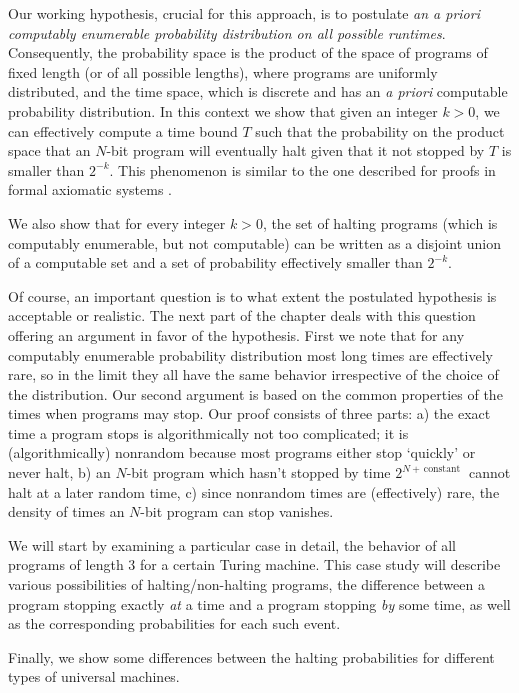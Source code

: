 \documentclass[12pt,twoside,openright]{report}
\begin{document}
Our working hypothesis, crucial for this approach, is to postulate {\it an a priori computably enumerable probability distribution on all possible runtimes}. Consequently, the probability space is the product of the space of programs of fixed length (or of all possible lengths), where programs are uniformly distributed, and the time space, which is discrete and has an {\it a priori} computable probability distribution. In this context we show that given an integer $k>0$, we can effectively compute a time bound $T$ such that  the probability on the product space that an $N$-bit program will eventually halt given that it not stopped by $T$ is smaller than
$2^{-k}$. This phenomenon is similar to the one described for proofs in formal axiomatic systems \cite{CJ}.

We also show that for every integer $k >0$, the set of halting programs (which is computably enumerable, but not computable) can be written as  a disjoint union of a computable set and a set of probability effectively smaller than  $2^{-k}$.

Of course, an important question is to what extent the postulated hypothesis is acceptable or realistic. The next part of the chapter deals with this question offering an argument in favor of the hypothesis.  First we note that for any computably enumerable probability distribution most long times are effectively rare, so in the limit they all have the same behavior irrespective of the choice of the distribution. Our second argument is based on the common properties of the times when programs may stop. Our proof consists of three parts: a) the exact time a program stops is algorithmically not too complicated; it is (algorithmically) nonrandom because most  programs either stop `quickly' or never halt, b) an $N$-bit program which hasn't stopped by time $2^{N +\, \mbox{constant }}$ cannot halt at a later random time, c) since nonrandom times are (effectively) rare, the density of times an $N$-bit program can stop vanishes.  


We will start by examining a particular case in detail, the behavior of all programs of length 3 for a certain Turing machine.  This case study will describe various possibilities of halting/non-halting programs, the difference between a program stopping exactly {\em at} a time and a program stopping {\em by} some time, as well as the corresponding probabilities for each such event.


Finally, we show some differences between the halting probabilities for different types of universal machines.
\end{document}

